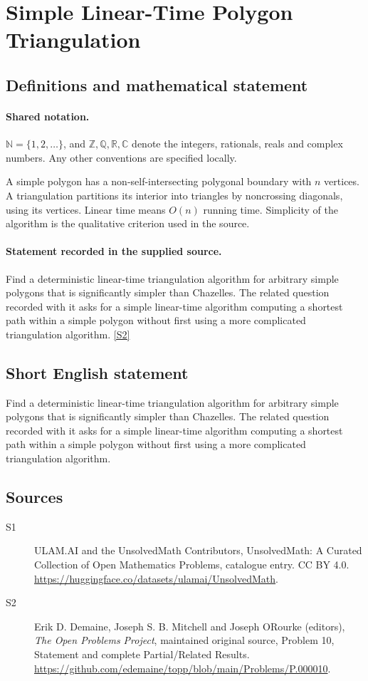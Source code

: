 \documentclass[11pt]{article}
\newcommand{\sref}[2]{\hyperlink{source:#1:#2}{[S#2]}}
\begin{document}
\section{Simple Linear-Time Polygon Triangulation}\label{statement}

\subsection{Definitions and mathematical statement}

\paragraph{Shared notation.}$\mathbb N=\{1,2,\ldots\}$, and $\mathbb Z,\mathbb Q,\mathbb R,\mathbb C$ denote the integers, rationals, reals and complex numbers. Any other conventions are specified locally.


A simple polygon has a non-self-intersecting polygonal boundary with $n$ vertices. A triangulation partitions its interior into triangles by noncrossing diagonals, using its vertices. Linear time means $O(n)$ running time. Simplicity of the algorithm is the qualitative criterion used in the source.
\paragraph{Statement recorded in the supplied source.}
Find a deterministic linear-time triangulation algorithm for arbitrary simple polygons that is significantly simpler than Chazelle\textquotesingle s. The related question recorded with it asks for a simple linear-time algorithm computing a shortest path within a simple polygon without first using a more complicated triangulation algorithm. \sref{statement}{2}
\subsection{Short English statement}
Find a deterministic linear-time triangulation algorithm for arbitrary simple polygons that is significantly simpler than Chazelle\textquotesingle s. The related question recorded with it asks for a simple linear-time algorithm computing a shortest path within a simple polygon without first using a more complicated triangulation algorithm.
\subsection{Sources}
\begin{description}
\item[\hypertarget{source:statement:1}{S1}] ULAM.AI and the UnsolvedMath Contributors, UnsolvedMath: A Curated Collection of Open Mathematics Problems, catalogue entry. CC BY 4.0. \url{https://huggingface.co/datasets/ulamai/UnsolvedMath}.
\item[\hypertarget{source:statement:2}{S2}] Erik D. Demaine, Joseph S. B. Mitchell and Joseph O\textquotesingle Rourke (editors), \emph{The Open Problems Project}, maintained original source, Problem 10, Statement and complete Partial/Related Results. \url{https://github.com/edemaine/topp/blob/main/Problems/P.000010}.
\end{description}
\label{end:statement}
\end{document}
